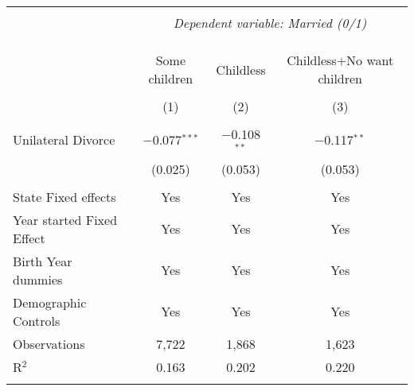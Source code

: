 
\begingroup 
\footnotesize 
\begin{tabular}{@{\extracolsep{5pt}}lccc} 
\\[-1.8ex]\hline 
\hline \\[-1.8ex] 
 & \multicolumn{3}{c}{\textit{Dependent variable: Married (0/1)}} \\ 
\cline{2-4} 
\\[-1.8ex] &  &  & \\[-4.8ex] \\ 
 & Some children & Childless & Childless+No want children \\ 
\\[-1.8ex] & (1) & (2) & (3)\\ 
\hline \\[-1.8ex] 
 Unilateral Divorce & $-$0.077$^{***}$ & $-$0.108$^{**}$ & $-$0.117$^{**}$ \\ 
  & (0.025) & (0.053) & (0.053) \\ 
 \hline \\[-1.8ex] 
State Fixed effects & Yes & Yes & Yes \\ 
Year started Fixed Effect & Yes & Yes & Yes \\ 
Birth Year dummies & Yes & Yes & Yes \\ 
Demographic Controls & Yes & Yes & Yes \\ 
Observations & 7,722 & 1,868 & 1,623 \\ 
R$^{2}$ & 0.163 & 0.202 & 0.220 \\ 
\hline 
\hline \\[-1.8ex] 
\end{tabular} 
\endgroup 
